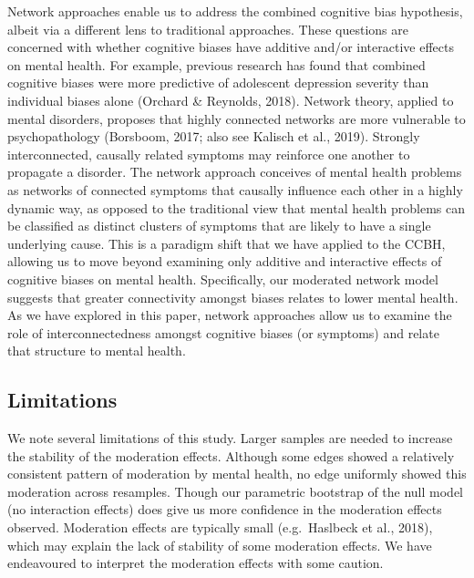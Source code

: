 \documentclass[
  english,
  man,floatsintext]{apa6}
\begin{document}
Network approaches enable us to address the combined cognitive bias hypothesis, albeit via a different lens to traditional approaches. These questions are concerned with whether cognitive biases have additive and/or interactive effects on mental health. For example, previous research has found that combined cognitive biases were more predictive of adolescent depression severity than individual biases alone (Orchard \& Reynolds, 2018). Network theory, applied to mental disorders, proposes that highly connected networks are more vulnerable to psychopathology (Borsboom, 2017; also see Kalisch et al., 2019). Strongly interconnected, causally related symptoms may reinforce one another to propagate a disorder. The network approach conceives of mental health problems as networks of connected symptoms that causally influence each other in a highly dynamic way, as opposed to the traditional view that mental health problems can be classified as distinct clusters of symptoms that are likely to have a single underlying cause. This is a paradigm shift that we have applied to the CCBH, allowing us to move beyond examining only additive and interactive effects of cognitive biases on mental health. Specifically, our moderated network model suggests that greater connectivity amongst biases relates to lower mental health. As we have explored in this paper, network approaches allow us to examine the role of interconnectedness amongst cognitive biases (or symptoms) and relate that structure to mental health.

\hypertarget{limitations}{%
\subsection{Limitations}\label{limitations}}

We note several limitations of this study. Larger samples are needed to increase the stability of the moderation effects. Although some edges showed a relatively consistent pattern of moderation by mental health, no edge uniformly showed this moderation across resamples. Though our parametric bootstrap of the null model (no interaction effects) does give us more confidence in the moderation effects observed. Moderation effects are typically small (e.g.~Haslbeck et al., 2018), which may explain the lack of stability of some moderation effects. We have endeavoured to interpret the moderation effects with some caution.
\end{document}
